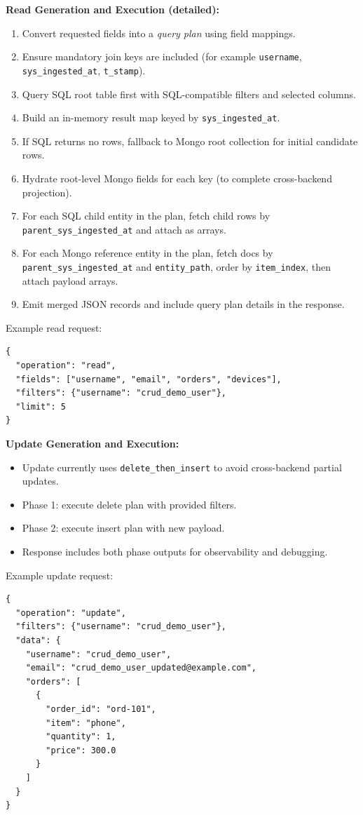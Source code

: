 \documentclass[12pt,a4paper]{article}
\begin{document}
\textbf{Read Generation and Execution (detailed):}
\begin{enumerate}[leftmargin=*]
  \item Convert requested fields into a \textit{query plan} using field mappings.
  \item Ensure mandatory join keys are included (for example \texttt{username}, \texttt{sys\_ingested\_at}, \texttt{t\_stamp}).
  \item Query SQL root table first with SQL-compatible filters and selected columns.
  \item Build an in-memory result map keyed by \texttt{sys\_ingested\_at}.
  \item If SQL returns no rows, fallback to Mongo root collection for initial candidate rows.
  \item Hydrate root-level Mongo fields for each key (to complete cross-backend projection).
  \item For each SQL child entity in the plan, fetch child rows by \texttt{parent\_sys\_ingested\_at} and attach as arrays.
  \item For each Mongo reference entity in the plan, fetch docs by \texttt{parent\_sys\_ingested\_at} and \texttt{entity\_path}, order by \texttt{item\_index}, then attach payload arrays.
  \item Emit merged JSON records and include query plan details in the response.
\end{enumerate}

Example read request:
\begin{lstlisting}[style=jsonstyle]
{
  "operation": "read",
  "fields": ["username", "email", "orders", "devices"],
  "filters": {"username": "crud_demo_user"},
  "limit": 5
}
\end{lstlisting}

\textbf{Update Generation and Execution:}
\begin{itemize}[leftmargin=*]
  \item Update currently uses \texttt{delete\_then\_insert} to avoid cross-backend partial updates.
  \item Phase 1: execute delete plan with provided filters.
  \item Phase 2: execute insert plan with new payload.
  \item Response includes both phase outputs for observability and debugging.
\end{itemize}

Example update request:
\begin{lstlisting}[style=jsonstyle]
{
  "operation": "update",
  "filters": {"username": "crud_demo_user"},
  "data": {
    "username": "crud_demo_user",
    "email": "crud_demo_user_updated@example.com",
    "orders": [
      {
        "order_id": "ord-101",
        "item": "phone",
        "quantity": 1,
        "price": 300.0
      }
    ]
  }
}
\end{lstlisting}
\end{document}
